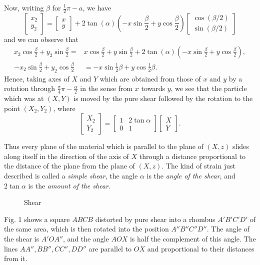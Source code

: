 Now, writing 
\(\beta\) for 
\(\frac{1}{2}\pi-a\), we have 
\[
\begin{bmatrix} x_2\\ y_2 \end{bmatrix}=
\begin{bmatrix} x\\ y \end{bmatrix}+ 
2 \tan(\alpha) \left(
-x \sin \frac{\beta}{2} + y \cos\frac{\beta}{2}
\right)
\begin{bmatrix}
\cos(\beta/2) \\
\sin(\beta/2) 
\end{bmatrix}
\]
and we can observe that 
\[
\begin{aligned}
x_2 \cos \frac{\beta}{2} + y_2 \sin \frac{\beta}{2}=&
x \cos \frac{\beta}{2} + y \sin \frac{\beta}{2}
+ 2 \tan(\alpha) \left(
-x \sin \frac{\beta}{2} + y \cos\frac{\beta}{2} \right), \\
-x_2 \sin \frac{\beta}{2} + y_2 \cos\frac{\beta}{2}&=
-x\sin\frac{1}{2}\beta+y\cos\frac{1}{2}\beta.
\end{aligned}
\]
Hence, taking axes of \(X\) and \(Y\) which are obtained from those of
\(x\) and \(y\) by a rotation through 
\(\frac{\pi}{4}\pi - \frac{\alpha}{2}\) in the sense from
\(x\) towards \(y\), we see that the particle which was at
\((X, Y)\) is moved by the pure shear followed by 
the rotation to the point
\((X_2, Y_2)\), where
\[
\begin{bmatrix}
X_2 \\
Y_2
\end{bmatrix} =
\begin{bmatrix}
1 & 2\tan\alpha \\
0 &  1
\end{bmatrix}
\begin{bmatrix}
X \\
Y
\end{bmatrix}
.\]

Thus every plane of the material which is parallel to the plane of
\((X, z)\) slides 
along itself in the direction of the axis of
\(X\) through a distance proportional 
to the distance of the plane from the plane of
\((X, z)\). The kind of strain just 
described is called a \textit{simple shear}, the angle \(\alpha\)
is the \textit{angle of the shear}, 
and \(2 \tan \alpha\) is the \textit{amount of the shear}.

\begin{figure}[!h]
\caption{Shear}
 \label{fig:1}
\end{figure}
Fig. 1 shows a square \(ABCB\) distorted by pure shear into a rhombus
\(A'B'C'D'\) of the same area, which is then rotated into the position
\(A''B''C''D''\). The angle of the shear is \(A'OA''\), and the angle \(AOX\)
is half the complement of this angle.  The lines \(AA'',BB'',CC'',DD''\) are
parallel to \(OX\) and proportional to their distances from it.

